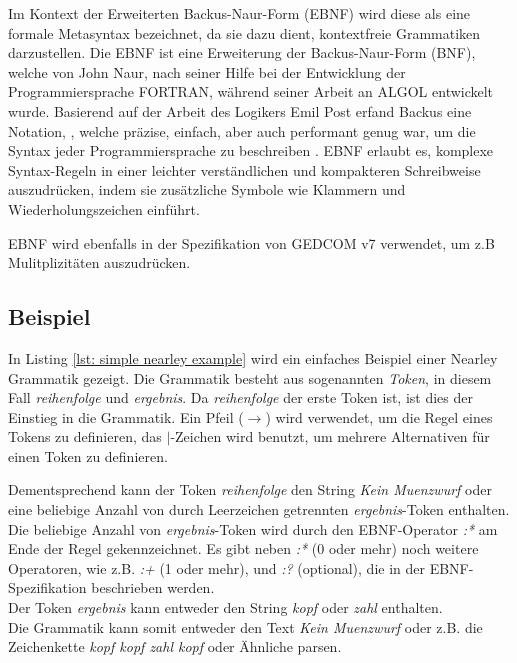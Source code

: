 Im Kontext der Erweiterten Backus-Naur-Form (EBNF) wird diese als eine formale Metasyntax bezeichnet, da sie dazu dient, kontextfreie Grammatiken 
darzustellen. Die EBNF ist eine Erweiterung der Backus-Naur-Form (BNF), welche von John Naur, nach seiner Hilfe bei der Entwicklung der Programmiersprache
FORTRAN, während seiner Arbeit an ALGOL entwickelt wurde. Basierend auf der Arbeit des Logikers Emil Post erfand Backus eine Notation, ,
welche präzise, einfach, aber auch performant genug war, um die Syntax jeder Programmiersprache zu beschreiben \cite{Feynman2016}. 
EBNF erlaubt es, komplexe Syntax-Regeln in einer leichter verständlichen und kompakteren Schreibweise auszudrücken, indem sie zusätzliche Symbole
wie Klammern und Wiederholungszeichen einführt.

EBNF wird ebenfalls in der Spezifikation von GEDCOM v7 verwendet, um z.B Mulitplizitäten auszudrücken.

\subsection*{Beispiel}

In Listing \ref*{lst: simple nearley example} wird ein einfaches Beispiel einer Nearley Grammatik gezeigt. 
Die Grammatik besteht aus sogenannten \textit{Token}, in diesem Fall \textit{reihenfolge} und \textit{ergebnis}.
Da \textit{reihenfolge} der erste Token ist, ist dies der Einstieg in die Grammatik. 
Ein Pfeil ($\rightarrow$) wird verwendet, um die Regel eines Tokens zu definieren, das $\vert$-Zeichen wird benutzt, 
um mehrere Alternativen für einen Token zu definieren.

Dementsprechend kann der Token \textit{reihenfolge} den String \textit{Kein Muenzwurf} oder eine beliebige Anzahl
von durch Leerzeichen getrennten \textit{ergebnis}-Token enthalten.\\

Die beliebige Anzahl von \textit{ergebnis}-Token wird durch den EBNF-Operator \textit{:*} am Ende der Regel gekennzeichnet.
Es gibt neben \textit{:*} (0 oder mehr) noch weitere Operatoren, wie z.B. \textit{:+} (1 oder mehr), und \textit{:?} (optional), die in der EBNF-Spezifikation 
beschrieben werden.\\

Der Token \textit{ergebnis} kann entweder den String \textit{kopf} oder \textit{zahl} enthalten.\\
Die Grammatik kann somit entweder den Text \textit{Kein Muenzwurf} oder z.B. die Zeichenkette \textit{kopf kopf zahl kopf} oder Ähnliche parsen.

